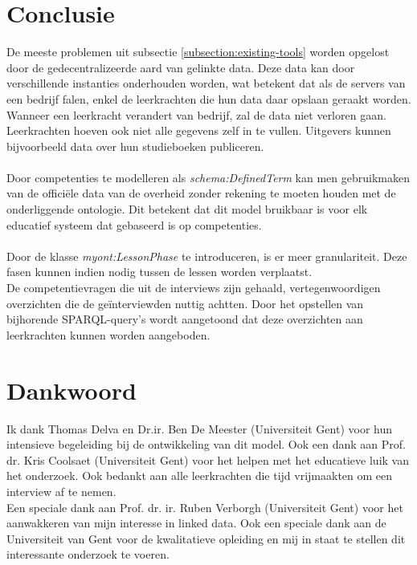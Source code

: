 \documentclass[12pt,journal]{IEEEtran}
\begin{document}
\section{Conclusie}

\noindent De meeste problemen uit subsectie \ref{subsection:existing-tools} worden opgelost door de gedecentralizeerde aard van gelinkte data.
Deze data kan door verschillende instanties onderhouden worden, wat betekent dat als de servers van een bedrijf falen, enkel de leerkrachten die hun data daar opslaan geraakt worden. 
Wanneer een leerkracht verandert van bedrijf, zal de data niet verloren gaan.\\
Leerkrachten hoeven ook niet alle gegevens zelf in te vullen. Uitgevers kunnen bijvoorbeeld data over hun studieboeken publiceren.\\ \\
Door competenties te modelleren als \textit{schema:DefinedTerm} kan men gebruikmaken van de officiële data van de overheid zonder rekening te moeten houden met de onderliggende ontologie.
Dit betekent dat dit model bruikbaar is voor elk educatief systeem dat gebaseerd is op competenties.\\ \\
Door de klasse \textit{myont:LessonPhase} te introduceren, is er meer granulariteit. Deze fasen kunnen indien nodig tussen de lessen worden verplaatst.\\
De competentievragen die uit de interviews zijn gehaald, vertegenwoordigen overzichten die de geïnterviewden nuttig achtten.
Door het opstellen van bijhorende SPARQL-query's wordt aangetoond dat deze overzichten aan leerkrachten kunnen worden aangeboden.

\section*{Dankwoord}
\noindent Ik dank Thomas Delva en Dr.ir. Ben De Meester (Universiteit Gent) voor hun intensieve begeleiding bij de ontwikkeling van dit model.
Ook een dank aan Prof. dr. Kris Coolsaet (Universiteit Gent) voor het helpen met het educatieve luik van het onderzoek.
Ook bedankt aan alle leerkrachten die tijd vrijmaakten om een interview af te nemen.\\
Een speciale dank aan Prof. dr. ir. Ruben Verborgh (Universiteit Gent) voor het aanwakkeren van mijn interesse in linked data.
Ook een speciale dank aan de Universiteit van Gent voor de kwalitatieve opleiding en mij in staat te stellen dit interessante onderzoek te voeren.




\end{document}
